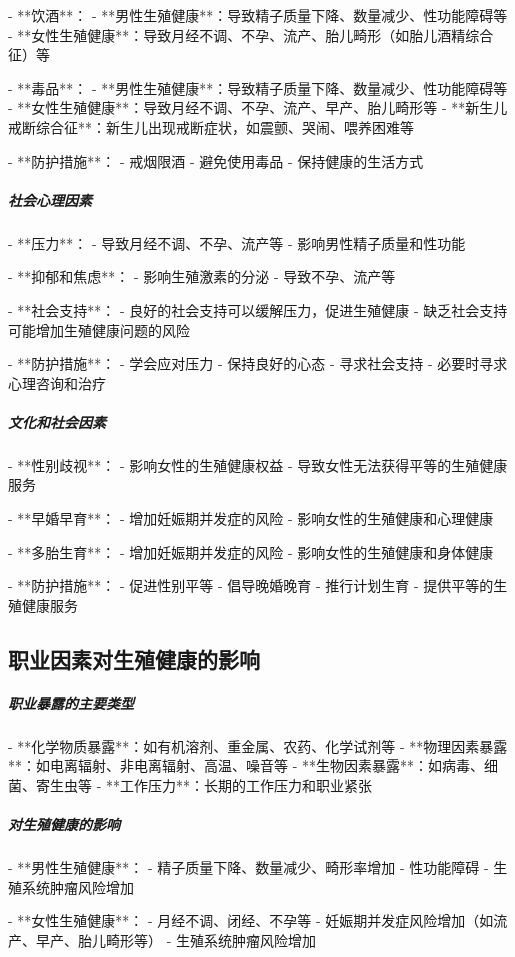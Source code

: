 \begin{enumerate}
- **饮酒**：
  - **男性生殖健康**：导致精子质量下降、数量减少、性功能障碍等
  - **女性生殖健康**：导致月经不调、不孕、流产、胎儿畸形（如胎儿酒精综合征）等

- **毒品**：
  - **男性生殖健康**：导致精子质量下降、数量减少、性功能障碍等
  - **女性生殖健康**：导致月经不调、不孕、流产、早产、胎儿畸形等
  - **新生儿戒断综合征**：新生儿出现戒断症状，如震颤、哭闹、喂养困难等

- **防护措施**：
  - 戒烟限酒
  - 避免使用毒品
  - 保持健康的生活方式

\subparagraph{社会心理因素}

- **压力**：
  - 导致月经不调、不孕、流产等
  - 影响男性精子质量和性功能

- **抑郁和焦虑**：
  - 影响生殖激素的分泌
  - 导致不孕、流产等

- **社会支持**：
  - 良好的社会支持可以缓解压力，促进生殖健康
  - 缺乏社会支持可能增加生殖健康问题的风险

- **防护措施**：
  - 学会应对压力
  - 保持良好的心态
  - 寻求社会支持
  - 必要时寻求心理咨询和治疗

\subparagraph{文化和社会因素}

- **性别歧视**：
  - 影响女性的生殖健康权益
  - 导致女性无法获得平等的生殖健康服务

- **早婚早育**：
  - 增加妊娠期并发症的风险
  - 影响女性的生殖健康和心理健康

- **多胎生育**：
  - 增加妊娠期并发症的风险
  - 影响女性的生殖健康和身体健康

- **防护措施**：
  - 促进性别平等
  - 倡导晚婚晚育
  - 推行计划生育
  - 提供平等的生殖健康服务

\subsection{职业因素对生殖健康的影响}

\subparagraph{职业暴露的主要类型}

- **化学物质暴露**：如有机溶剂、重金属、农药、化学试剂等
- **物理因素暴露**：如电离辐射、非电离辐射、高温、噪音等
- **生物因素暴露**：如病毒、细菌、寄生虫等
- **工作压力**：长期的工作压力和职业紧张

\subparagraph{对生殖健康的影响}

- **男性生殖健康**：
  - 精子质量下降、数量减少、畸形率增加
  - 性功能障碍
  - 生殖系统肿瘤风险增加

- **女性生殖健康**：
  - 月经不调、闭经、不孕等
  - 妊娠期并发症风险增加（如流产、早产、胎儿畸形等）
  - 生殖系统肿瘤风险增加


\end{enumerate}
